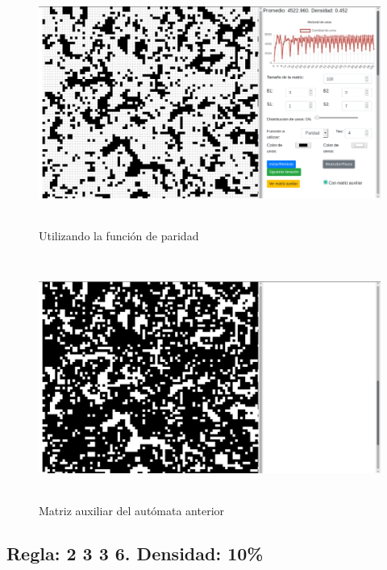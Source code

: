 \documentclass[12pt, titlepage]{article}
\begin{document}
\begin{figure}[H]
\begin{center}
 \includegraphics[width=15cm, height=8cm]{./img/3317-paridad.png}
 \caption{Utilizando la función de paridad}
 \label{fig:3317-paridad}
\end{center}
\end{figure}

\begin{figure}[H]
\begin{center}
 \includegraphics[width=15cm, height=8cm]{./img/3317-paridad-aux.png}
 \caption{Matriz auxiliar del autómata anterior}
 \label{fig:3317-paridad-aux}
\end{center}
\end{figure}

\subsection{Regla: 2 3 3 6. Densidad: 10\%}
\end{document}
